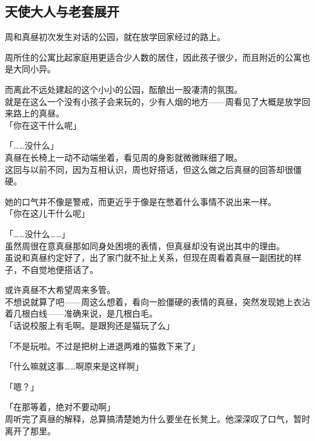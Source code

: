 \subsection{天使大人与老套展开}

周和真昼初次发生对话的公园，就在放学回家经过的路上。

周所住的公寓比起家庭用更适合少人数的居住，因此孩子很少，而且附近的公寓也是大同小异。

而离此不远处建起的这个小小的公园，酝酿出一股凄清的氛围。\\

就是在这么一个没有小孩子会来玩的，少有人烟的地方——周看见了大概是放学回来路上的真昼。\\

「你在这干什么呢」

「……没什么」\\

真昼在长椅上一动不动端坐着，看见周的身影就微微眯细了眼。\\

这回与以前不同，因为互相认识，周也好搭话，但这么做之后真昼的回答却很僵硬。

她的口气并不像是警戒，而更近乎于像是在憋着什么事情不说出来一样。\\

「你在这儿干什么呢」

「……没什么……」\\

虽然周很在意真昼那如同身处困境的表情，但真昼却没有说出其中的理由。\\

虽说和真昼约定好了，出了家门就不扯上关系，但现在周看着真昼一副困扰的样子，不自觉地便搭话了。

或许真昼不大希望周来多管。\\

不想说就算了吧——周这么想着，看向一脸僵硬的表情的真昼，突然发现她上衣沾着几根白线——准确来说，是几根白毛。\\

「话说校服上有毛啊。是跟狗还是猫玩了么」

「不是玩啦。不过是把树上进退两难的猫救下来了」

「什么嘛就这事……啊原来是这样啊」

「嗯？」

「在那等着，绝对不要动啊」\\

周听完了真昼的解释，总算搞清楚她为什么要坐在长凳上。他深深叹了口气，暂时离开了那里。\\

